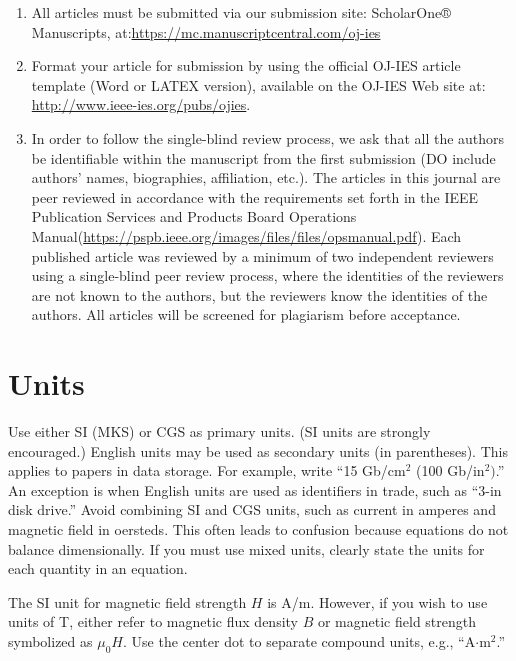 \documentclass{ieeeojies}
\begin{document}
\begin{enumerate}
\item All articles must be submitted via our submission site: ScholarOne® Manuscripts, at:\break \underline{https://mc.manuscriptcentral.com/oj-ies}

\item Format your article for submission by using the official OJ-IES article template (Word or LATEX version), available on the OJ-IES Web site at: \break\underline{http://www.ieee-ies.org/pubs/ojies}.

\item In order to follow the single-blind review process, we ask that all the authors be identifiable within the manuscript from the first submission (DO include authors’ names, biographies, affiliation, etc.). The articles in this journal are peer reviewed in accordance with the requirements set forth in the IEEE Publication Services and Products Board Operations Manual\break(\underline{https://pspb.ieee.org/images/files/files/opsmanual.pdf}). Each published article was reviewed by a minimum of two independent reviewers using a single-blind peer review process, where the identities of the reviewers are not known to the authors, but the reviewers know the identities of the authors. All articles will be screened for plagiarism before acceptance.

\end{enumerate}

\section{Units}
Use either SI (MKS) or CGS as primary units. (SI units are strongly 
encouraged.) English units may be used as secondary units (in parentheses). 
This applies to papers in data storage. For example, write ``15 
Gb/cm$^{2}$ (100 Gb/in$^{2})$.'' An exception is when 
English units are used as identifiers in trade, such as ``3\textonehalf-in 
disk drive.'' Avoid combining SI and CGS units, such as current in amperes 
and magnetic field in oersteds. This often leads to confusion because 
equations do not balance dimensionally. If you must use mixed units, clearly 
state the units for each quantity in an equation.

The SI unit for magnetic field strength $H$ is A/m. However, if you wish to use 
units of T, either refer to magnetic flux density $B$ or magnetic field 
strength symbolized as $\mu _{0}H$. Use the center dot to separate 
compound units, e.g., ``A$\cdot $m$^{2}$.''
\end{document}
